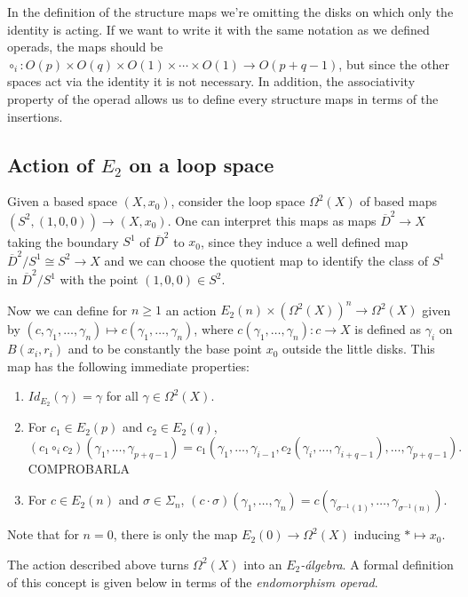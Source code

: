 \documentclass[TFM.tex]{subfiles}
\begin{document}
\begin{remark}
In the definition of the structure maps we're omitting the disks on which only the identity is acting. If we want to write it with the same notation as we defined operads, the maps should be $\circ_i:O(p)\times O(q)\times O(1)\times\cdots \times O(1)\to O(p+q-1)$, but since the other spaces act via the identity it is not necessary. In addition, the associativity property of the operad allows us to define every structure maps in terms of the insertions. 
\end{remark}




\subsection{Action of $E_2$ on a loop space}
Given a based space $(X,x_0)$, consider the loop space $\Omega^2(X)$ of based maps $(S^2, (1,0,0))\to (X, x_0)$. One can interpret this maps as maps $\overline{D}^2\to X$ taking the boundary $S^1$ of $\overline{D}^2$ to $x_0$, since they induce a well defined map $\overline{D}^2/S^1\cong S^2\to X$ and we can choose the quotient map to identify the class of $S^1$ in $\overline{D}^2/S^1$ with the point $(1,0,0)\in S^2$. 

Now we can define for $n\geq 1$ an action $E_2(n)\times (\Omega^2(X))^n\to \Omega^2(X)$ given by $(c,\gamma_1,\dots, \gamma_n)\mapsto c(\gamma_1,\dots, \gamma_n)$, where 
$c(\gamma_1,\dots, \gamma_n):c\to X$ is defined as $\gamma_i$ on $B(x_i,r_i)$ and to be constantly the base point $x_0$ outside the little disks. This map has the following immediate properties:
\begin{enumerate}
\item $Id_{E_2}(\gamma)=\gamma$ for all $\gamma\in \Omega^2(X)$.
\item For $c_1\in E_2(p)$ and $c_2\in E_2(q)$, 
$$(c_1\circ_i c_2)(\gamma_1,\dots, \gamma_{p+q-1})=c_1(\gamma_1,\dots, \gamma_{i-1}, c_2(\gamma_i,\dots, \gamma_{i+q-1}),\dots, \gamma_{p+q-1}).$$ COMPROBARLA
\item For $c\in E_2(n)$ and $\sigma\in\Sigma_n$, $(c\cdot \sigma)(\gamma_1,\dots,\gamma_n)=c(\gamma_{\sigma^{-1}(1)},\dots, \gamma_{\sigma^{-1}(n)})$. 
\end{enumerate}
Note that for $n=0$, there is only the map $E_2(0)\to\Omega^2(X)$ inducing $*\mapsto x_0$. 

The action described above turns $\Omega^2(X)$ into an \emph{$E_2$-álgebra}. A formal definition of this concept is given below in terms of the \emph{endomorphism operad}. 
\end{document}
